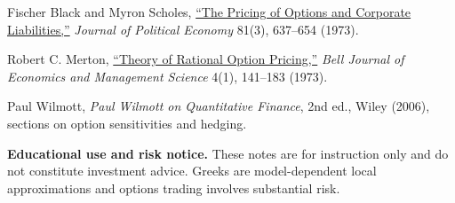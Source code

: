 \documentclass[11pt]{article}
\begin{document}
\begin{readinglist}
  \item Fischer Black and Myron Scholes, \href{https://doi.org/10.1086/260062}{``The Pricing of Options and Corporate Liabilities,''} \emph{Journal of Political Economy} 81(3), 637--654 (1973).
  \item Robert C. Merton, \href{https://doi.org/10.2307/1831029}{``Theory of Rational Option Pricing,''} \emph{Bell Journal of Economics and Management Science} 4(1), 141--183 (1973).
  \item Paul Wilmott, \emph{Paul Wilmott on Quantitative Finance}, 2nd ed., Wiley (2006), sections on option sensitivities and hedging.
\end{readinglist}

\vfill
{\sffamily\footnotesize\color{vnmuted}\textbf{Educational use and risk notice.} These notes are for instruction only and do not constitute investment advice. Greeks are model-dependent local approximations and options trading involves substantial risk.}
\end{document}
